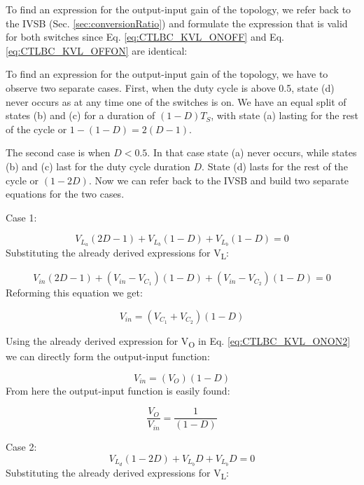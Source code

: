 To find an expression for the output-input gain of the topology, we refer back to the IVSB (Sec. \ref{sec:conversionRatio}) and formulate the expression that is valid for both switches since Eq. \ref{eq:CTLBC_KVL_ONOFF} and Eq. \ref{eq:CTLBC_KVL_OFFON} are identical:

To find an expression for the output-input gain of the topology, we 
have to observe two separate cases. First, when the duty cycle is above 0.5, state (d) never occurs as at any time one of the switches is on. We have an equal split of states (b) and (c) for a duration of $(1-D)T_S$, with state (a) lasting for the rest of the cycle or $1-(1-D)=2(D-1)$.

The second case is when $D<0.5$. In that case state (a) never occurs, while states (b) and (c) last for the duty cycle duration $D$. State (d) lasts for the rest of the cycle or $(1-2D)$.
Now we can refer back to the IVSB and build two separate equations for the two cases. 

Case 1: 

\begin{equation}
	V_{L_a}(2D-1)+V_{L_b}(1-D)+V_{L_b}(1-D)=0
	\label{eq:CTLBC_IVSB}
\end{equation}
Substituting the already derived expressions for V\textsubscript{L}:

\begin{equation}
	V_{in}(2D-1)+(V_{in} - V_{C_1})(1-D)+(V_{in} - V_{C_2})(1-D)=0
	\label{eq:CTLBC_IVSB2}
\end{equation}
Reforming this equation we get: 

\begin{equation}
	V_{in}=(V_{C_1} + V_{C_2})(1-D)
	\label{eq:CTLBC_IVSB3}
\end{equation}

Using the already derived expression for V\textsubscript{O} in Eq. \ref{eq:CTLBC_KVL_ONON2} we can directly form the output-input function: 

\begin{equation}
	V_{in}=(V_{O})(1-D)
	\label{eq:CTLBC_IVSB4}
\end{equation}
From here the output-input function is easily found:

\begin{equation}
	\frac{V_O}{V_{in}}=\frac{1}{(1-D)}
	\label{eq:CTLBC_IVSB5}
\end{equation}

Case 2: 
\begin{equation}
	V_{L_d}(1-2D)+V_{L_b}D+V_{L_b}D=0
	\label{eq:CTLBC_CASE2}
\end{equation}
Substituting the already derived expressions for V\textsubscript{L}:

